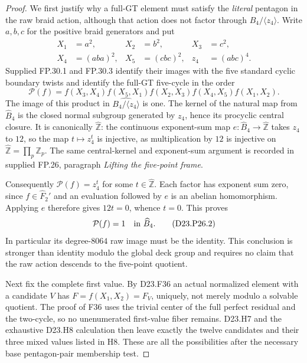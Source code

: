 \begin{proof}
We first justify why a full-GT element must satisfy the
\emph{literal} pentagon in the raw braid action, although
that action does not factor through $B_4/\langle z_4\rangle$.
Write $a,b,c$ for the positive braid generators and put
\[
\begin{aligned}
X_1&=a^2,&X_2&=b^2,&X_3&=c^2,\\
X_4&=(aba)^2,&X_5&=(cbc)^2,&z_4&=(abc)^4.
\end{aligned}
\]
Supplied FP.30.1 and FP.30.3 identify their images with
the five standard cyclic boundary twists and identify the
full-GT five-cycle in the order
\[
 \mathcal P(f)=f(X_3,X_4)f(X_5,X_1)f(X_2,X_3)
                    f(X_4,X_5)f(X_1,X_2).
                                                        \tag{D23.P26.1}
\]
The image of this product in
$\widehat{B_4/\langle z_4\rangle}$ is one.
The kernel of the natural map from $\widehat B_4$ is
the closed normal subgroup generated by $z_4$, hence its
procyclic central closure. It is canonically
$\widehat{\mathbb Z}$: the continuous exponent-sum map
$e:\widehat B_4\to\widehat{\mathbb Z}$ takes $z_4$ to
$12$, so the map $t\mapsto z_4^t$ is injective, as
multiplication by $12$ is injective on
$\widehat{\mathbb Z}=\prod_p\mathbb Z_p$. The same
central-kernel and exponent-sum argument is recorded in
supplied FP.26, paragraph \emph{Lifting the five-point
frame}.

Consequently $\mathcal P(f)=z_4^t$ for some
$t\in\widehat{\mathbb Z}$. Each factor has exponent
sum zero, since $f\in\widehat F_2'$ and an evaluation
followed by $e$ is an abelian homomorphism. Applying $e$
therefore gives $12t=0$, whence $t=0$. This proves
\[
                   \mathcal P(f)=1\quad\hbox{in }\widehat B_4.
                                                        \tag{D23.P26.2}
\]
In particular its degree-$8064$ raw image must be the
identity. This conclusion is stronger than identity
modulo the global deck group and requires no claim that
the raw action descends to the five-point quotient.

Next fix the complete first value. By D23.F36 an actual
normalized element with a candidate $V$ has
$F=f(X_1,X_2)=F_V$, uniquely, not merely modulo a
solvable quotient. The proof of F36 uses the trivial
center of the full perfect residual and the two-cycle,
so no unenumerated first-value fiber remains. D23.H7
and the exhaustive D23.H8 calculation then leave exactly
the twelve candidates and their three mixed values listed
in H8. These are all the possibilities after the necessary
base pentagon-pair membership test.


\end{proof}
